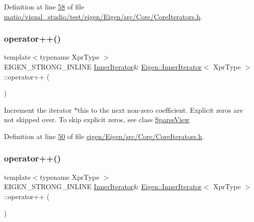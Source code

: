Definition at line \hyperlink{matio_2visual__studio_2test_2eigen_2_eigen_2src_2_core_2_core_iterators_8h_source_l00058}{58} of file \hyperlink{matio_2visual__studio_2test_2eigen_2_eigen_2src_2_core_2_core_iterators_8h_source}{matio/visual\+\_\+studio/test/eigen/\+Eigen/src/\+Core/\+Core\+Iterators.\+h}.

\mbox{\label{class_eigen_1_1_inner_iterator_ae4ed2eece5291e23d870b7238878e2f1}} 
\subsubsection{\texorpdfstring{operator++()}{operator++()}\hspace{0.1cm}{\footnotesize\ttfamily [1/2]}}
{\footnotesize\ttfamily template$<$typename Xpr\+Type $>$ \\
E\+I\+G\+E\+N\+\_\+\+S\+T\+R\+O\+N\+G\+\_\+\+I\+N\+L\+I\+NE \hyperlink{class_eigen_1_1_inner_iterator}{Inner\+Iterator}\& \hyperlink{class_eigen_1_1_inner_iterator}{Eigen\+::\+Inner\+Iterator}$<$ Xpr\+Type $>$\+::operator++ (\begin{DoxyParamCaption}{ }\end{DoxyParamCaption})\hspace{0.3cm}{\ttfamily [inline]}}

Increment the iterator {\ttfamily $\ast$this} to the next non-\/zero coefficient. Explicit zeros are not skipped over. To skip explicit zeros, see class \hyperlink{group___sparse_core___module_class_eigen_1_1_sparse_view}{Sparse\+View} 

Definition at line \hyperlink{eigen_2_eigen_2src_2_core_2_core_iterators_8h_source_l00050}{50} of file \hyperlink{eigen_2_eigen_2src_2_core_2_core_iterators_8h_source}{eigen/\+Eigen/src/\+Core/\+Core\+Iterators.\+h}.

\mbox{\label{class_eigen_1_1_inner_iterator_ae4ed2eece5291e23d870b7238878e2f1}} 
\subsubsection{\texorpdfstring{operator++()}{operator++()}\hspace{0.1cm}{\footnotesize\ttfamily [2/2]}}
{\footnotesize\ttfamily template$<$typename Xpr\+Type $>$ \\
E\+I\+G\+E\+N\+\_\+\+S\+T\+R\+O\+N\+G\+\_\+\+I\+N\+L\+I\+NE \hyperlink{class_eigen_1_1_inner_iterator}{Inner\+Iterator}\& \hyperlink{class_eigen_1_1_inner_iterator}{Eigen\+::\+Inner\+Iterator}$<$ Xpr\+Type $>$\+::operator++ (\begin{DoxyParamCaption}{ }\end{DoxyParamCaption})\hspace{0.3cm}{\ttfamily [inline]}}


